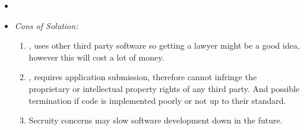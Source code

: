 \vspace*{0.5cm}
\begin{itemize}
  \item[] 
  \item[] \textsl{\Large Cons of Solution:}
  \begin{enumerate}
    \item \selenium, uses other third party software so getting a lawyer might be a good idea, however
    this will cost a lot of money.
    \item \canvas, requires application submission, therefore cannot infringe the proprietary or 
    intellectual property rights of any third party. And possible termination if code is implemented
    poorly or not up to their standard.
    \item Secruity concerns may slow software development down in the future.
  \end{enumerate} 
\end{itemize}